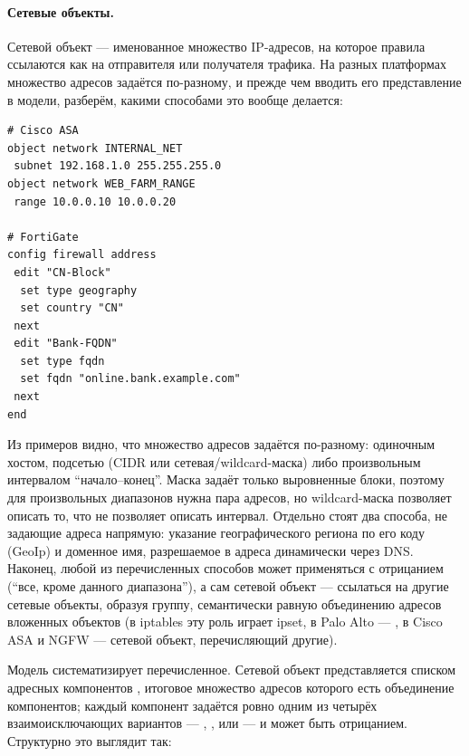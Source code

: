 \paragraph{Сетевые объекты.} Сетевой объект --- именованное множество IP-адресов, на которое правила ссылаются как на отправителя или получателя трафика. На разных платформах множество адресов задаётся по-разному, и прежде чем вводить его представление в модели, разберём, какими способами это вообще делается:

\begin{verbatim}
# Cisco ASA
object network INTERNAL_NET
 subnet 192.168.1.0 255.255.255.0
object network WEB_FARM_RANGE
 range 10.0.0.10 10.0.0.20

# FortiGate
config firewall address
 edit "CN-Block"
  set type geography
  set country "CN"
 next
 edit "Bank-FQDN"
  set type fqdn
  set fqdn "online.bank.example.com"
 next
end
\end{verbatim}

Из примеров видно, что множество адресов задаётся по-разному: одиночным хостом, подсетью (CIDR или сетевая/wildcard-маска) либо произвольным интервалом ``начало--конец''. Маска задаёт только выровненные блоки, поэтому для произвольных диапазонов нужна пара адресов, но wildcard-маска позволяет описать то, что не позволяет описать интервал. Отдельно стоят два способа, не задающие адреса напрямую: указание географического региона по его коду (GeoIp) и доменное имя, разрешаемое в адреса динамически через DNS. Наконец, любой из перечисленных способов может применяться с отрицанием (``все, кроме данного диапазона''), а сам сетевой объект --- ссылаться на другие сетевые объекты, образуя группу, семантически равную объединению адресов вложенных объектов (в iptables эту роль играет ipset, в Palo Alto --- , в Cisco ASA и NGFW --- сетевой объект, перечисляющий другие).

Модель систематизирует перечисленное. Сетевой объект представляется списком адресных компонентов , итоговое множество адресов которого есть объединение компонентов; каждый компонент задаётся ровно одним из четырёх взаимоисключающих вариантов --- , ,  или  --- и может быть отрицанием. Структурно это выглядит так:

